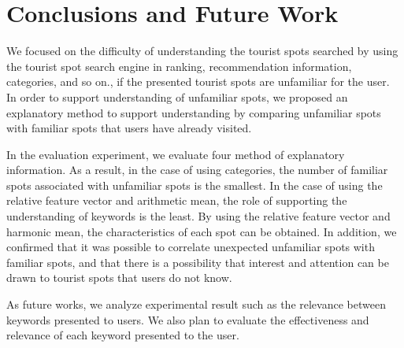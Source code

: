 \documentclass[journal]{IAENGtran}
\begin{document}
\section{Conclusions and Future Work}
\label{sec:Conclusions and Future Work}
We focused on the difficulty of understanding the tourist spots searched by using the tourist spot search engine in ranking, recommendation information, categories, and so on., if the presented tourist spots are unfamiliar for the user.
In order to support understanding of unfamiliar spots, we proposed an explanatory method to support understanding by comparing unfamiliar spots with familiar spots that users have already visited.

In the evaluation experiment, we evaluate four method of explanatory information.
As a result, in the case of using categories, the number of familiar spots associated with unfamiliar spots is the smallest.
In the case of using the relative feature vector and arithmetic mean, the role of supporting the understanding of keywords is the least.
By using the relative feature vector and harmonic mean, the characteristics of each spot can be obtained.
In addition, we confirmed that it was possible to correlate unexpected unfamiliar spots with familiar spots, and that there is a possibility that interest and attention can be drawn to tourist spots that users do not know.

As future works, we analyze experimental result such as the relevance between keywords presented to users.
We also plan to evaluate the effectiveness and relevance of each keyword presented to the user.
\end{document}
